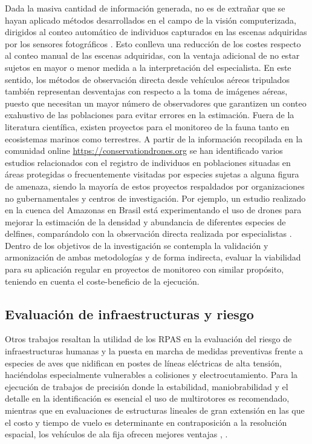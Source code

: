 \documentclass[onecolumn]{extarticle}
\begin{document}
Dada la masiva cantidad de información generada, no es de extrañar que
se hayan aplicado métodos desarrollados en el campo de la visión
computerizada, dirigidos al conteo automático de individuos capturados
en las escenas adquiridas por los sensores fotográficos
\citep{Lhoest2015, Abd-Elrahman2005a, VanGemert2015}. Esto conlleva una
reducción de los costes respecto al conteo manual de las escenas
adquiridas, con la ventaja adicional de no estar sujetos en mayor o
menor medida a la interpretación del especialista. En este sentido, los
métodos de observación directa desde vehículos aéreos tripulados también
representan desventajas con respecto a la toma de imágenes aéreas,
puesto que necesitan un mayor número de observadores que garantizen un
conteo exahustivo de las poblaciones para evitar errores en la
estimación. Fuera de la literatura científica, existen proyectos para el
monitoreo de la fauna tanto en ecosistemas marinos como terrestres. A
partir de la información recopilada en la comunidad online
\url{https://conservationdrones.org} se han identificado varios estudios
relacionados con el registro de individuos en poblaciones situadas en
áreas protegidas o frecuentemente visitadas por especies sujetas a
alguna figura de amenaza, siendo la mayoría de estos proyectos
respaldados por organizaciones no gubernamentales y centros de
investigación. Por ejemplo, un estudio realizado en la cuenca del
Amazonas en Brasil está experimentando el uso de drones para mejorar la
estimación de la densidad y abundancia de diferentes especies de
delfines, comparándolo con la observación directa realizada por
especialistas \citep{WichS2017}. Dentro de los objetivos de la
investigación se contempla la validación y armonización de ambas
metodologías y de forma indirecta, evaluar la viabilidad para su
aplicación regular en proyectos de monitoreo con similar propósito,
teniendo en cuenta el coste-beneficio de la ejecución.

\subsection{Evaluación de infraestructuras y
riesgo}\label{evaluacion-de-infraestructuras-y-riesgo}

Otros trabajos resaltan la utilidad de los RPAS en la evaluación del
riesgo de infraestructuras humanas y la puesta en marcha de medidas
preventivas frente a especies de aves que nidifican en postes de líneas
eléctricas de alta tensión, haciéndolas especialmente vulnerables a
colisiones y electrocutamiento. Para la ejecución de trabajos de
precisión donde la estabilidad, maniobrabilidad y el detalle en la
identificación es esencial \citep{Lobermeier2015} el uso de multirotores
es recomendado, mientras que en evaluaciones de estructuras lineales de
gran extensión en las que el costo y tiempo de vuelo es determinante en
contraposición a la resolución espacial, los vehículos de ala fija
ofrecen mejores ventajas \citep{Mulero-Pazmany2014a}, \citep{Zhang2016}.
\end{document}
